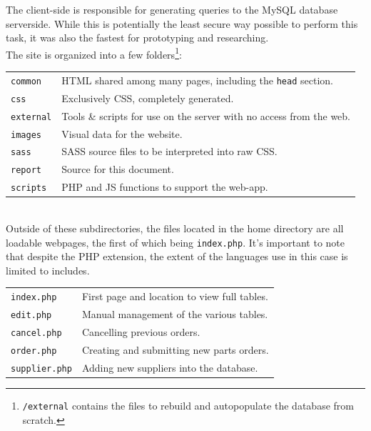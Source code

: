 \documentclass{article}
\begin{document}
The client-side is responsible for generating queries to the MySQL database serverside. While this is potentially the least secure way possible to perform this task, it was also the fastest for prototyping and researching. \\

The site is organized into a few folders\footnote{\texttt{/external} contains the files to rebuild and autopopulate the database from scratch.}:\\

\begin{tabular}{|l|l|}
\hline
\texttt{common} & HTML shared among many pages, including the \texttt{head} section. \\
\texttt{css} & Exclusively CSS, completely generated.\\
\texttt{external} & Tools \& scripts for use on the server with no access from the web. \\
\texttt{images} & Visual data for the website.\\
\texttt{sass} & SASS source files to be interpreted into raw CSS. \\
\texttt{report} & Source for this document. \\
\texttt{scripts} & PHP and JS functions  to support the web-app.\\
\hline
\end{tabular}
\\

Outside of these subdirectories, the files located in the home directory are all loadable webpages, the first of which being \texttt{index.php}. It's important to note that despite the PHP extension, the extent of the languages use in this case is limited to includes.\\

\begin{tabular}{|l|l|}
\hline
\texttt{index.php} & First page and location to view full tables. \\
\texttt{edit.php} & Manual management of the various tables.\\
\texttt{cancel.php} & Cancelling previous orders. \\
\texttt{order.php} & Creating and submitting new parts orders.\\
\texttt{supplier.php} & Adding new suppliers into the database. \\
\hline
\end{tabular}
\vspace{.5cm}
\end{document}
